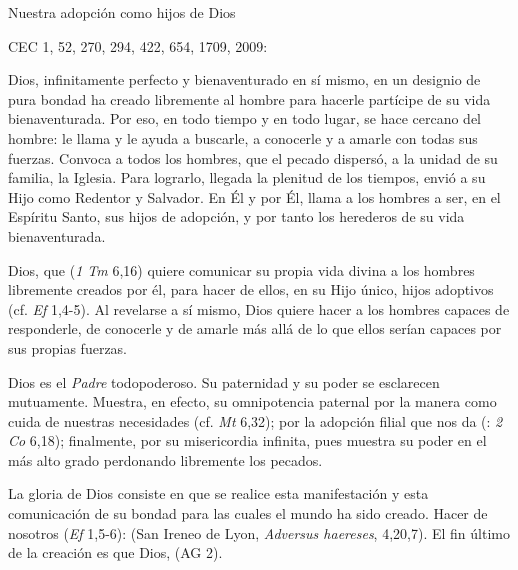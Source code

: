 	Nuestra adopción como hijos de Dios
	
	CEC 1, 52, 270, 294, 422, 654, 1709, 2009:
	
	 Dios, infinitamente perfecto y bienaventurado en sí mismo, en un designio de pura bondad ha creado libremente al hombre para hacerle partícipe de su vida bienaventurada. Por eso, en todo tiempo y en todo lugar, se hace cercano del hombre: le llama y le ayuda a buscarle, a conocerle y a amarle con todas sus fuerzas. Convoca a todos los hombres, que el pecado dispersó, a la unidad de su familia, la Iglesia. Para lograrlo, llegada la plenitud de los tiempos, envió a su Hijo como Redentor y Salvador. En Él y por Él, llama a los hombres a ser, en el Espíritu Santo, sus hijos de adopción, y por tanto los herederos de su vida bienaventurada.
	
	 Dios, que  (\emph{1 Tm} 6,16) quiere comunicar su propia vida divina a los hombres libremente creados por él, para hacer de ellos, en su Hijo único, hijos adoptivos (cf. \emph{Ef} 1,4-5). Al revelarse a sí mismo, Dios quiere hacer a los hombres capaces de responderle, de conocerle y de amarle más allá de lo que ellos serían capaces por sus propias fuerzas.
	
	
	 Dios es el \emph{Padre} todopoderoso. Su paternidad y su poder se esclarecen mutuamente. Muestra, en efecto, su omnipotencia paternal por la manera como cuida de nuestras necesidades (cf. \emph{Mt} 6,32); por la adopción filial que nos da (: \emph{2 Co} 6,18); finalmente, por su misericordia infinita, pues muestra su poder en el más alto grado perdonando libremente los pecados.
	
	 La gloria de Dios consiste en que se realice esta manifestación y esta comunicación de su bondad para las cuales el mundo ha sido creado. Hacer de nosotros  (\emph{Ef} 1,5-6):  (San Ireneo de Lyon, \emph{Adversus haereses}, 4,20,7). El fin último de la creación es que Dios,  (AG 2).
	
